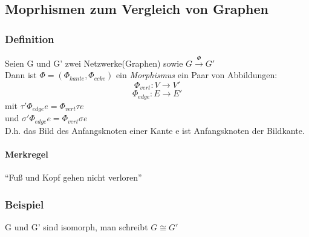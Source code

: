 \subsection{Moprhismen zum Vergleich von Graphen}
\subsubsection{Definition}
Seien G und G' zwei Netzwerke(Graphen) sowie $G \overset{\Phi}{\rightarrow} G'$ 
\\Dann ist $\Phi  = (\Phi_{kante}, \Phi_{ecke})$  ein \emph{Morphismus} ein Paar von Abbildungen:
$$ \Phi_{vert}: V \rightarrow V'$$
$$\Phi_{edge}: E \rightarrow E'$$
mit $\tau' \Phi_{edge} e = \Phi_{vert} \tau e$
\\und $ {\sigma '}  \Phi_{edge} e = \Phi_{vert} \sigma e$
\\D.h. das Bild des Anfangsknoten einer Kante e ist Anfangsknoten der Bildkante.
\paragraph{Merkregel}``Fuß und Kopf gehen nicht verloren''

\subsubsection{Beispiel}
\begin{figure}[h!]
  \hfill
\end{figure}
G und G' sind isomorph, man schreibt $G \cong G'$
